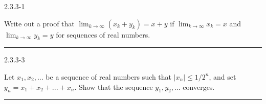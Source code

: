 \documentclass[11pt]{article}
\begin{document}
 2.3.3-1

Write out a proof that $\lim_{k \to \infty} (x_k + y_k) = x + y$ if $\lim_{k \to \infty} x_k = x$ and $\lim_{k \to \infty} y_k = y$ for sequences of real numbers.
\hrule




 2.3.3-3

Let $x_1, x_2, ...$ be a sequence of real numbers such that $|x_n| \leq 1/2^n$, and set $y_n = x_1 + x_2 + ... + x_n$. Show that the sequence $y_1, y_2, ...$ converges. 
\hrule
\end{document}
